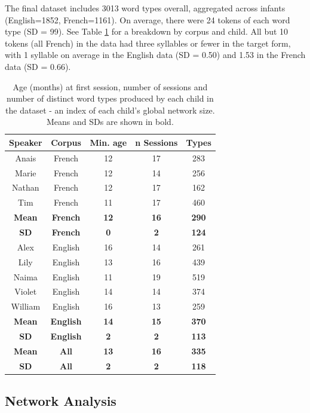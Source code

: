 \documentclass[
  man,mask,floatsintext]{apa6}
\begin{document}
The final dataset includes 3013 word types overall, aggregated across infants (English=1852, French=1161). On average, there were 24 tokens of each word type (SD = 99). See Table \ref{tab:table-data-overview} for a breakdown by corpus and child. All but 10 tokens (all French) in the data had three syllables or fewer in the target form, with 1 syllable on average in the English data (SD = 0.50) and 1.53 in the French data (SD = 0.66).

\begin{longtable}[t]{ccccc}
\caption{\label{tab:table-data-overview}Age (months) at first session, number of sessions and number of distinct word types produced by each child in the dataset - an index of each child's global network size. Means and SDs are shown in bold.}\\
\toprule
Speaker & Corpus & Min. age & n Sessions & Types\\
\midrule
Anais & French & 12 & 17 & 283\\
Marie & French & 12 & 14 & 256\\
Nathan & French & 12 & 17 & 162\\
Tim & French & 11 & 17 & 460\\
\midrule
\textbf{Mean} & \textbf{French} & \textbf{12} & \textbf{16} & \textbf{290}\\
\addlinespace
\textbf{SD} & \textbf{French} & \textbf{0} & \textbf{2} & \textbf{124}\\
\midrule
Alex & English & 16 & 14 & 261\\
Lily & English & 13 & 16 & 439\\
Naima & English & 11 & 19 & 519\\
Violet & English & 14 & 14 & 374\\
\addlinespace
William & English & 16 & 13 & 259\\
\midrule
\textbf{Mean} & \textbf{English} & \textbf{14} & \textbf{15} & \textbf{370}\\
\textbf{SD} & \textbf{English} & \textbf{2} & \textbf{2} & \textbf{113}\\
\midrule
\textbf{Mean} & \textbf{All} & \textbf{13} & \textbf{16} & \textbf{335}\\
\textbf{SD} & \textbf{All} & \textbf{2} & \textbf{2} & \textbf{118}\\
\bottomrule
\end{longtable}

\hypertarget{network-analysis}{%
\subsection{Network Analysis}\label{network-analysis}}
\end{document}
